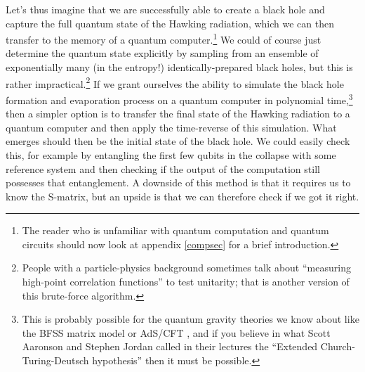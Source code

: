 \documentclass[12pt]{article}
\begin{document}
Let's thus imagine that we are successfully able to create a black hole and capture the full quantum state of the Hawking radiation, which we can then transfer to the memory of a quantum computer.\footnote{The reader who is unfamiliar with quantum computation and quantum circuits should now look at appendix \ref{compsec} for a brief introduction.}  We could of course just determine the quantum state explicitly by sampling from an ensemble of exponentially many (in the entropy!) identically-prepared black holes, but this is rather impractical.\footnote{People with a particle-physics background sometimes talk about ``measuring high-point correlation functions'' to test unitarity; that is another version of this brute-force algorithm.}  If we grant ourselves the ability to simulate the black hole formation and evaporation process on a quantum computer in polynomial time,\footnote{This is probably possible for the quantum gravity theories we know about like the BFSS matrix model or AdS/CFT \cite{feynman1982simulating,lloyd1996universal,Jordan:2011ne}, and if you believe in what Scott Aaronson and Stephen Jordan called in their lectures the ``Extended Church-Turing-Deutsch hypothesis'' then it must be possible.} then a simpler option is to transfer the final state of the Hawking radiation to a quantum computer and then apply the time-reverse of this simulation.  What emerges should then be the initial state of the black hole.  We could easily check this, for example by entangling the first few qubits in the collapse with some reference system and then checking if the output of the computation still possesses that entanglement.  A downside of this method is that it requires us to know the S-matrix, but an upside is that we can therefore check if we got it right.  
\end{document}
